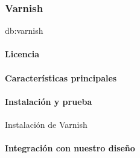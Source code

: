\subsubsection{Varnish}
\label{soa:tecnologias:varnish}

\gls{db:varnish}

\paragraph{Licencia}

\paragraph{Características principales}

\paragraph{Instalación y prueba}

\begin{listing}[H]
  \caption{Instalación de Varnish}
  \label{soa:tecnologias:varnish-cache:bash-preparacion}
\end{listing}

\paragraph{Integración con nuestro diseño}
